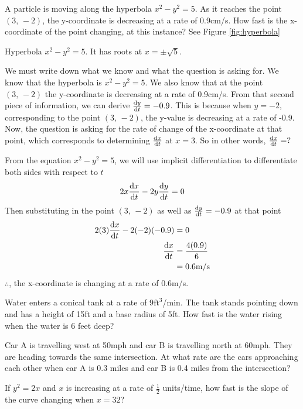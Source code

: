 \documentclass[working]{tuftebook}
\begin{document}
\begin{eg}
    A particle is moving along the hyperbola $x^2-y^2=5$. As it reaches the point $(3,\,-2)$, the y-coordinate is decreasing at a rate of 0.9cm/s. How fast is the x-coordinate of the point changing, at this instance? See Figure \ref{fig:hyperbola}
        \begin{marginfigure}
            \centering
            \caption{Hyperbola $x^2-y^2=5$. It has roots at $x=\pm \sqrt{5}$.}
            \label{fig:hyperbola}
        \end{marginfigure}

    We must write down what we know and what the question is asking for. We know that the hyperbola is $x^2-y^2=5$. We also know that at the point $(3,\,-2)$ the y-coordinate is decreasing at a rate of 0.9cm/s. From that second piece of information, we can derive $ \dv{y}{t}(-2)=-0.9$. This is because when $y=-2$, corresponding to the point $(3,\,-2)$, the y-value is decreasing at a rate of -0.9. Now, the question is asking for the rate of change of the x-coordinate at that point, which corresponds to determining $ \dv{x}{t}$ at $x=3$. So in other words, $ \dv{x}{t}=?$ 

    From the equation $x^2-y^2=5$, we will use implicit differentiation to differentiate both sides with respect to $t$
    \[
        2x \dv{x}{t}-2y \dv{y}{t}=0 
    \]
    Then substituting in the point $(3,\,-2)$ as well as $ \dv{y}{t}=-0.9$ at that point  
    \begin{align*}
        2(3) \dv{x}{t}-2(-2)(-0.9)&=0\\ 
        \dv{x}{t}&= \frac{4(0.9)}{6}\\ 
                 &= 0.6 \text{m/s}
    \end{align*}
    $\therefore$, the x-coordinate is changing at a rate of 0.6m/s. 
\end{eg}

\newpage
\begin{problems}
    \item{Water enters a conical tank at a rate of 9$ \text{ft}^3$/min. The tank stands pointing down and has a height of 15ft and a base radius of 5ft. How fast is the water rising when the water is 6 feet deep?}
    \item{Car A is travelling west at 50mph and car B is travelling north at 60mph. They are heading towards the same intersection. At what rate are the cars approaching each other when car A is 0.3 miles and car B is 0.4 miles from the intersection?}
    \item{If $y^2=2x$ and $x$ is increasing at a rate of $ \frac{1}{2}$ units/time, how fast is the slope of the curve changing when $x=32$?}
\end{problems}
\end{document}
